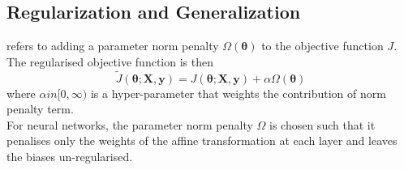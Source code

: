 \subsection{Regularization and Generalization}

\begin{definition}  refers to adding a parameter norm penalty $\Omega(\bm{\theta})$ to the objective function $J$. The regularised objective function is then
\begin{equation*}
\tilde{J}(\bm{\theta}; \bm{X}, \bm{y}) = J(\bm{\theta}; \bm{X}, \bm{y}) + \alpha \Omega(\bm{\theta}) \nonumber
\end{equation*}
where $\alpha in [0, \infty)$ is a hyper-parameter that weights the contribution of norm penalty term.\\
For neural networks, the parameter norm penalty $\Omega$ is chosen such that it penalises only the weights of the affine transformation at each layer and leaves the biases un-regularised.
\end{definition}

